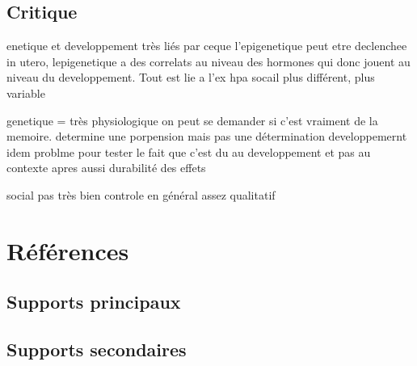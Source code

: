 \documentclass[french]{article}
\begin{document}
			
			
		
			
		\subsection{Critique}
			enetique et developpement très liés par ceque l'epigenetique peut etre declenchee in utero, lepigenetique a des correlats au niveau des hormones qui donc jouent au niveau du developpement. Tout est lie a l'ex hpa
			socail plus différent, plus variable
			
			genetique = très physiologique on peut se demander si c'est vraiment de la memoire. determine une porpension mais pas une détermination
			developpemernt idem problme pour tester le fait que c'est du au developpement et pas au contexte apres aussi durabilité des effets
			
			social pas très bien controle en général assez qualitatif
			
	\newpage
	\section*{Références}
	\subsection*{Supports principaux}
	\printbibliography[heading=maingeno, keyword=main, keyword=geno]
	\printbibliography[heading=maindevelo, keyword=main, keyword=develo]
	\printbibliography[heading=mainsocio, keyword=main, keyword=socio]
	\subsection*{Supports secondaires}
	\printbibliography[heading=minorgeno, keyword=minor, keyword=geno]
	\printbibliography[heading=minordevelo, keyword=minor, keyword=develo]
	\printbibliography[heading=minorsocio, keyword=minor, keyword=socio]
	\nocite{*}
\end{document}
